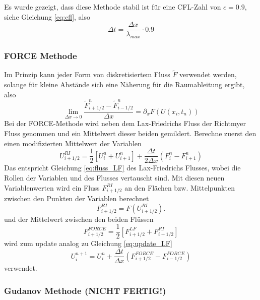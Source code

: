 Es wurde gezeigt, dass diese Methode stabil ist für eine
CFL-Zahl von $c = 0.9$, siehe Gleichung \ref{eq:cfl}, also  
\[
\Delta t = \frac{\Delta x}{\lambda_{max}} \cdot 0.9
\]

\subsubsection{FORCE Methode}

Im Prinzip kann jeder Form von diskretisiertem Fluss
$\tilde{F}$ verwendet werden, solange für kleine Abstände sich eine
Näherung für die Raumableitung ergibt, also
\[
\lim_{\Delta x \rightarrow 0} \frac{\tilde{F}_{i+1/2}^{n} -
    \tilde{F}_{i-1/2}^{n}} {\Delta x} = \partial_x F(U(x_i,t_n))
\]
Bei der FORCE-Methode wird neben dem Lax-Friedrichs Fluss der
Richtmyer Fluss genommen und ein Mittelwert dieser beiden gemildert. 
Berechne zuerst den einen modifizierten Mittelwert der Variablen
\begin{equation}
U^{RI}_{i+1/2} = \frac{1}{2}\left[U_i^u + U_{i+1}^n\right] + \frac{\Delta t}{2
  \Delta x}\left(F_{i}^n - F_{i+1}^n \right) \label{eq:fluss_RI}
\end{equation}
Das entspricht Gleichung \ref{eq:fluss_LF} des Lax-Friedrichs
Flusses, wobei die Rollen der Variablen und des Flusses vertauscht
sind.  Mit diesen neuen Variablenwerten wird ein Fluss
$F^{RI}_{i+1/2}$ an den Flächen bzw. Mittelpunkten zwischen den
Punkten der Variablen berechnet
\begin{equation}
F^{RI}_{i+1/2} = F(U^{RI}_{i+1/2}) .
\end{equation}
und der Mittelwert zwischen den beiden Flüssen
\begin{equation}
F^{FORCE}_{i+1/2} = \frac{1}{2}\left[ F^{LF}_{i+1/2} +  F^{RI}_{i+1/2} \right]
\end{equation}
wird zum update analog zu Gleichung \ref{eq:update_LF}
\begin{equation}
U_i^{n+1} = U_i^n + \frac{\Delta t}{\Delta x}\left(F^{FORCE}_{i+1/2} -
F^{FORCE}_{i-1/2}\right)
\end{equation}
verwendet.



\subsubsection{Gudanov Methode (NICHT FERTIG!)}


